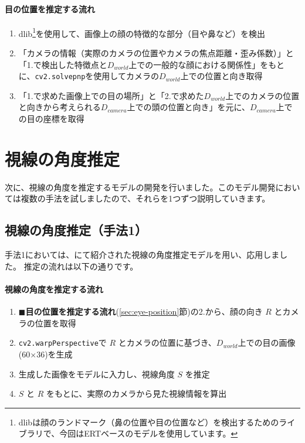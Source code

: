 \paragraph{目の位置を推定する流れ}
\begin{enumerate}
    \item dlib\footnote{dlibは顔のランドマーク（鼻の位置や目の位置など）を検出するためのライブラリで、今回はERTベースのモデル\cite{valle2018deeply}を使用しています。}を使用して、画像上の顔の特徴的な部分（目や鼻など）を検出
    \item 「カメラの情報（実際のカメラの位置やカメラの焦点距離・歪み係数）」と「1.で検出した特徴点と$D_{world}$上での一般的な顔における関係性」をもとに、\texttt{cv2.solvepnp}を使用してカメラの$D_{world}$上での位置と向き取得
    \item 「1.で求めた画像上での目の場所」と「2.で求めた$D_{world}$上でのカメラの位置と向きから考えられる$D_{camera}$上での頭の位置と向き」を元に、$D_{camera}$上での目の座標を取得
\end{enumerate}

\section{視線の角度推定}
次に、視線の角度を推定するモデルの開発を行いました。このモデル開発においては複数の手法を試しましたので、それらを1つずつ説明していきます。

\subsection{視線の角度推定（手法1）}\label{subsec:gaze-estimation-1}
手法1においては、\cite{zhang2017mpiigaze}にて紹介された視線の角度推定モデルを用い、応用しました。
推定の流れは以下の通りです。

\paragraph{視線の角度を推定する流れ}
\begin{enumerate}
    \item $\blacksquare$\textbf{目の位置を推定する流れ}(\ref{sec:eye-position}節)の2.から、顔の向き $R$ とカメラの位置を取得
    \item \texttt{cv2.warpPerspective}で $R$ とカメラの位置に基づき、$D_{world}$上での目の画像(60×36)を生成
    \item 生成した画像をモデルに入力し、視線角度 $S$ を推定
    \item $S$ と $R$ をもとに、実際のカメラから見た視線情報を算出
\end{enumerate}

